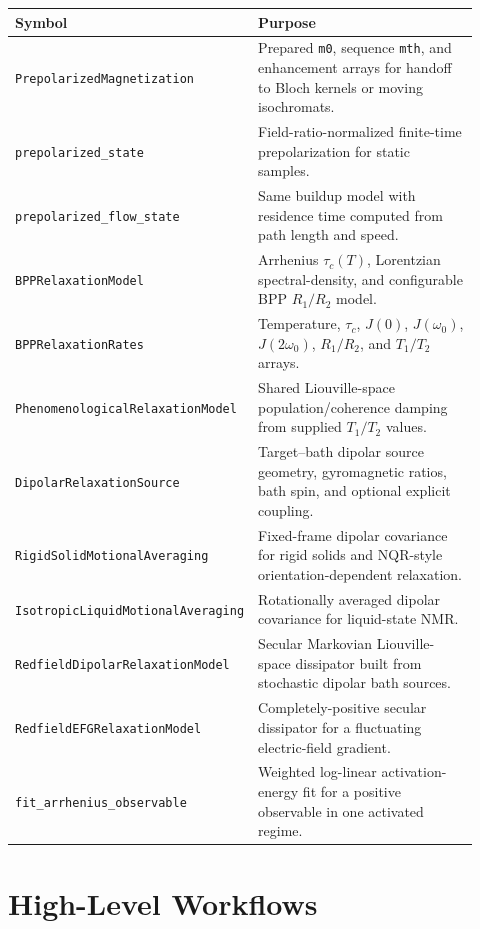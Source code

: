 \documentclass[11pt,oneside]{report}
\newcommand{\code}[1]{\texttt{#1}}
\begin{document}
\begin{longtable}{p{0.43\linewidth}p{0.49\linewidth}}
\toprule
Symbol & Purpose \\
\midrule
\code{PrepolarizedMagnetization} & Prepared \code{m0}, sequence \code{mth}, and enhancement arrays for handoff to Bloch kernels or moving isochromats. \\
\code{prepolarized\_state} & Field-ratio-normalized finite-time prepolarization for static samples. \\
\code{prepolarized\_flow\_state} & Same buildup model with residence time computed from path length and speed. \\
\code{BPPRelaxationModel} & Arrhenius \(\tau_c(T)\), Lorentzian spectral-density, and configurable BPP \(R_1/R_2\) model. \\
\code{BPPRelaxationRates} & Temperature, \(\tau_c\), \(J(0)\), \(J(\omega_0)\), \(J(2\omega_0)\), \(R_1/R_2\), and \(T_1/T_2\) arrays. \\
\code{PhenomenologicalRelaxationModel} & Shared Liouville-space population/coherence damping from supplied \(T_1/T_2\) values. \\
\code{DipolarRelaxationSource} & Target--bath dipolar source geometry, gyromagnetic ratios, bath spin, and optional explicit coupling. \\
\code{RigidSolidMotionalAveraging} & Fixed-frame dipolar covariance for rigid solids and NQR-style orientation-dependent relaxation. \\
\code{IsotropicLiquidMotionalAveraging} & Rotationally averaged dipolar covariance for liquid-state NMR. \\
\code{RedfieldDipolarRelaxationModel} & Secular Markovian Liouville-space dissipator built from stochastic dipolar bath sources. \\
\code{RedfieldEFGRelaxationModel} & Completely-positive secular dissipator for a fluctuating electric-field gradient. \\
\code{fit\_arrhenius\_observable} & Weighted log-linear activation-energy fit for a positive observable in one activated regime. \\
\bottomrule
\end{longtable}

\section{High-Level Workflows}
\end{document}

